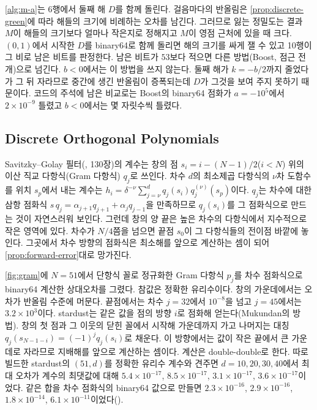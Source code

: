 \cref{alg:m-a}는 6행에서 둘째 해 $D$를 함께 돌린다. 걸음마다의 반올림은 \cref{prop:discrete-green}에 따라 해들의 크기에 비례하는 오차를 남긴다. 그러므로 잃는 정밀도는 결과 $M$이 해들의 크기보다 얼마나 작은지로 정해지고 $M$이 영점 근처에 있을 때 크다. $(0,1)$에서 시작한 $D$를 binary64로 함께 돌리면 해의 크기를 싸게 잴 수 있고 10행이 그 비로 남은 비트를 판정한다. 남은 비트가 $53$보다 적으면 다른 방법(Boost, 점근 전개)으로 넘긴다. $b<0$에서는 이 방법을 쓰지 않는다. 둘째 해가 $k=-b/2$까지 줄었다가 그 뒤 자라므로 중간에 생긴 반올림이 증폭되는데 $D$가 그것을 보여 주지 못하기 때문이다. 코드의 주석에 남은 비교로는 Boost의 binary64 점화가 $a=-10^5$에서 $2\times10^{-9}$ 틀렸고 $b<0$에서는 몇 자릿수씩 틀렸다.

\subsection{Discrete Orthogonal Polynomials}

Savitzky--Golay 필터(, 130장)의 계수는 창의 점 $s_i=i-(N-1)/2$($i<N$) 위의 이산 직교 다항식(Gram 다항식) $q_j$로 쓰인다. 차수 $d$의 최소제곱 다항식의 $\nu$차 도함수를 위치 $s_p$에서 내는 계수는 $h_i=\delta^{-\nu}\sum_{j=\nu}^dq_j(s_i)q_j^{(\nu)}(s_p)$이다. $q_j$는 차수에 대한 삼항 점화식 $s\,q_j=\alpha_{j+1}q_{j+1}+\alpha_jq_{j-1}$을 만족하므로 $q_j(s_i)$를 그 점화식으로 만드는 것이 자연스러워 보인다. 그런데 창의 양 끝은 높은 차수의 다항식에서 지수적으로 작은 영역에 있다. 차수가 $N/4$쯤을 넘으면 끝점 $s_0$이 그 다항식들의 전이점 바깥에 놓인다. 그곳에서 차수 방향의 점화식은 최소해를 앞으로 계산하는 셈이 되어 \cref{prop:forward-error}대로 망가진다.

\cref{fig:gram}에 $N=51$에서 단항식 꼴로 정규화한 Gram 다항식 $p_j$를 차수 점화식으로 binary64 계산한 상대오차를 그렸다. 참값은 정확한 유리수이다. 창의 가운데에서는 오차가 반올림 수준에 머문다. 끝점에서는 차수 $j=32$에서 $10^{-8}$을 넘고 $j=45$에서는 $3.2\times10^3$이다. stardust는 같은 값을 점의 방향 $i$로 점화해 얻는다(Mukundan의 방법). 창의 첫 점과 그 이웃의 닫힌 꼴에서 시작해 가운데까지 가고 나머지는 대칭 $q_j(s_{N-1-i})=(-1)^jq_j(s_i)$로 채운다. 이 방향에서는 값이 작은 끝에서 큰 가운데로 자라므로 지배해를 앞으로 계산하는 셈이다. 계산은 double-double로 한다. 따로 빌드한 stardust의 $(51,d)$를 정확한 유리수 계수와 견주면 $d=10,20,30,40$에서 최대 오차가 계수의 최댓값에 대해 $5.4\times10^{-17}$, $8.5\times10^{-17}$, $3.1\times10^{-17}$, $3.6\times10^{-17}$이었다. 같은 합을 차수 점화식의 binary64 값으로 만들면 $2.3\times10^{-16}$, $2.9\times10^{-16}$, $1.8\times10^{-14}$, $6.1\times10^{-11}$이었다().

